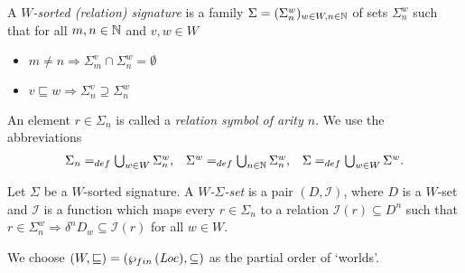 \documentclass[12pt,a4paper]{report}
\newcommand{\I}{\mathcal{I}}
\begin{document}
\begin{definition}
  A {\em $W$-sorted (relation) signature} is a family $\Sigma=(\Sigma^w_n)_{w\in W,n\in \mathbb N}$
  of sets $\Sigma^w_n$ such that for all $m,n\in \mathbb N$ and $v,w\in W$
  \begin{itemize}
    \item $m \ne n \Rightarrow \Sigma^v_m \cap \Sigma^w_n = \emptyset$
    \item $v \sqsubseteq w \Rightarrow \Sigma^v_n \supseteq \Sigma^w_n$
  \end{itemize}
\end{definition}

An element $r \in \Sigma_n$ is called a {\em relation symbol of arity $n$}. We use the abbreviations
\[\begin{array}{rcl}
  \Sigma_n =_{def} \bigcup_{w\in W} \Sigma^w_n, &
  \Sigma^w =_{def} \bigcup_{n\in \mathbb N} \Sigma^w_n, &
  \Sigma =_{def} \bigcup_{w\in W} \Sigma^w.
\end{array}\]

\begin{definition}
  Let $\Sigma$ be a $W$-sorted signature. A {\em $W$-$\Sigma$-set} is a pair
  $(D,\I)$, where $D$ is a $W$-set and $\I$ is a function which maps every
  $r \in \Sigma_n$ to a relation $\I(r) \subseteq D^n$ such that
  $r \in \Sigma^w_n \Rightarrow \delta^n D_w \subseteq \I(r)$ for all $w \in W$.
\end{definition}

We choose $(W,\sqsubseteq) = (\wp_{fin}\,(\mathit{Loc}),\subseteq)$ as the partial order of `worlds'.
\end{document}
